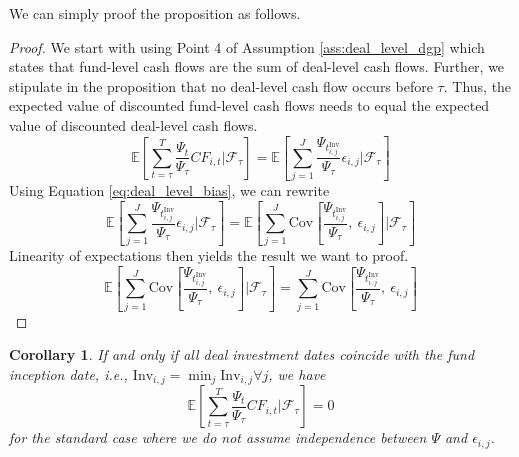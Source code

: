 \documentclass[12pt]{article}
\newtheorem{corollary}{Corollary}
\begin{document}
We can simply proof the proposition as follows.
\begin{proof}
		We start with using Point 4 of Assumption \ref{ass:deal_level_dgp} which states that fund-level cash flows are the sum of deal-level cash flows.
		Further, we stipulate in the proposition that no deal-level cash flow occurs before $\tau$.
		Thus, the expected value of discounted fund-level cash flows needs to equal the expected value of discounted deal-level cash flows. 
		\begin{equation}
		\label{eq:price_pooled_cash_flows_proof_1}
		\mathbb{E} \left[ 
		\sum_{t = \tau}^T
		\frac{\Psi_{t}}{\Psi_{\tau}}
		{CF}_{i,t}
		\left| \mathcal{F}_{\tau} \right.
		\right]
		=
		\mathbb{E} \left[ 
		\sum_{j=1}^J
		\frac{\Psi_{t_{i,j}^{\mathrm{Inv}}}}{\Psi_{\tau}}
		\epsilon_{i,j}
		\left| \mathcal{F}_{\tau} \right.
		\right]
	\end{equation}
	Using Equation \ref{eq:deal_level_bias}, we can rewrite
	\begin{equation}
		\label{eq:price_pooled_cash_flows_proof_2}
		\mathbb{E} \left[ 
		\sum_{j=1}^J
		\frac{\Psi_{t_{i,j}^{\mathrm{Inv}}}}{\Psi_{\tau}}
		\epsilon_{i,j}
		\left| \mathcal{F}_{\tau} \right.
		\right]
		=
		\mathbb{E} \left[ 
		\sum_{j=1}^J
		\mathrm{Cov} \left[ \frac{\Psi_{t_{i,j}^{\mathrm{Inv}}}}{\Psi_{\tau}}, \ \epsilon_{i,j} \right]
		\left| \mathcal{F}_{\tau} \right.
		\right]
	\end{equation}
	Linearity of expectations then yields the result we want to proof.
		\begin{equation}
		\label{eq:price_pooled_cash_flows_proof_3}
		\mathbb{E} \left[ 
		\sum_{j=1}^J
		\mathrm{Cov} \left[ \frac{\Psi_{t_{i,j}^{\mathrm{Inv}}}}{\Psi_{\tau}}, \ \epsilon_{i,j} \right]
		\left| \mathcal{F}_{\tau} \right.
		\right]
		=
		\sum_{j=1}^J
		\mathrm{Cov} \left[ \frac{\Psi_{t_{i,j}^{\mathrm{Inv}}}}{\Psi_{\tau}}, \ \epsilon_{i,j} \right]
	\end{equation}
\end{proof}


\begin{corollary}
	If and only if all deal investment dates coincide with the fund inception date, i.e., $\mathrm{Inv}_{i,j} = \min_j \mathrm{Inv}_{i,j} \forall j$, we have
	\begin{equation}
		\label{eq:price_pooled_cash_flows_corollary}
		\mathbb{E} \left[ 
		\sum_{t = \tau}^T
		\frac{\Psi_{t}}{\Psi_{\tau}}
		{CF}_{i,t}
		\left| \mathcal{F}_{\tau} \right.
		\right]
		=
		0
	\end{equation}
	for the standard case where we do not assume independence between $\Psi$ and $\epsilon_{i,j}$.
\end{corollary}
\end{document}
